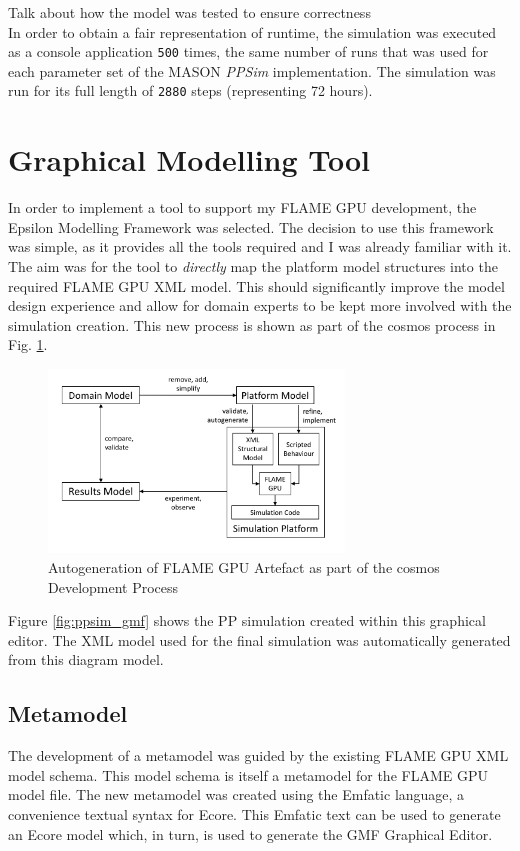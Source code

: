 \documentclass{UoYCSproject}
\begin{document}
Talk about how the model was tested to ensure correctness\\

In order to obtain a fair representation of runtime, the simulation was executed as a console application \texttt{500} times, the same number of runs that was used for each parameter set of the MASON \textit{PPSim} implementation.
The simulation was run for its full length of \texttt{2880} steps (representing 72 hours).

\section{Graphical Modelling Tool}
In order to implement a tool to support my \gls{FLAME GPU} development, the Epsilon Modelling Framework was selected.
The decision to use this framework was simple, as it provides all the tools required and I was already familiar with it.
The aim was for the tool to \textit{directly} map the platform model structures into the required \gls{FLAME GPU} XML model.
This should significantly improve the model design experience and allow for domain experts to be kept more involved with the simulation creation.
This new process is shown as part of the \gls{cosmos} process in Fig. \ref{fig:flame_improved}.

\begin{figure}[htp]
\centering
\includegraphics[width=0.7\textwidth]{Appendix/CoSMoS_FLAME}
\caption{Autogeneration of \gls{FLAME GPU} Artefact as part of the \gls{cosmos} Development Process}
\label{fig:flame_improved}
\end{figure}

Figure \ref{fig:ppsim_gmf} shows the \gls{PP} simulation created within this graphical editor.
The XML model used for the final simulation was automatically generated from this diagram model.

\subsection{Metamodel}
The development of a metamodel was guided by the existing \gls{FLAME GPU} XML model schema.
This model schema is itself a metamodel for the \gls{FLAME GPU} model file.
The new metamodel was created using the Emfatic language, a convenience textual syntax for Ecore.
This Emfatic text can be used to generate an Ecore model which, in turn, is used to generate the GMF Graphical Editor.
\end{document}

